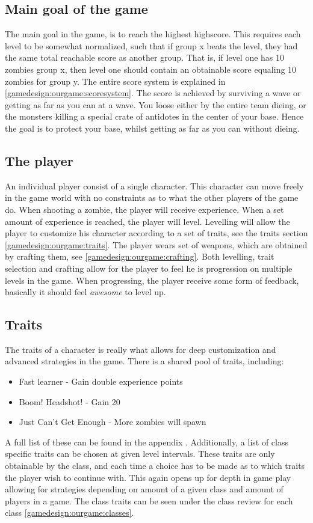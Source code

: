 \subsection*{Main goal of the game}
The main goal in the game, is to reach the highest highscore. This requires each level to be somewhat normalized, such that if group x beats the level, they had the same total reachable score as another group. That is, if level one has 10 zombies group x, then level one should contain an obtainable score equaling 10 zombies for group y. The entire score system is explained in \ref{gamedesign:ourgame:scoresystem}. The score is achieved by surviving a wave or getting as far as you can at a wave. You loose either by the entire team dieing, or the monsters killing a special crate of antidotes in the center of your base. Hence the goal is to protect your base, whilst getting as far as you can without dieing.

\subsection*{The player}
 An individual player consist of a single character. This character can move freely in the game world with no constraints as to what the other players of the game do. When shooting a zombie, the player will receive experience. When a set amount of experience is reached, the player will level. Levelling will allow the player to customize his character according to a set of traits, see the traits section \ref{gamedesign:ourgame:traits}. The player wears set of weapons, which are obtained by crafting them, see \ref{gamedesign:ourgame:crafting}. Both levelling, trait selection and crafting allow for the player to feel he is progression on multiple levels in the game. When progressing, the player receive some form of feedback, basically it should feel \emph{awesome} to level up.

\subsection*{Traits}\label{gamedesign:ourgame:traits}
The traits of a character is really what allows for deep customization and advanced strategies in the game. There is a shared pool of traits, including:
\begin{itemize}
\item Fast learner - Gain double experience points
\item Boom! Headshot!  - Gain 20%
\item Just Can’t Get Enough - More zombies will spawn
\end{itemize} 
A full list of these can be found in the appendix . Additionally, a list of class specific traits can be chosen at given level intervals. These traits are only obtainable by the class, and each time a choice has to be made as to which traits the player wish to continue with. This again opens up for depth in game play allowing for strategies depending on amount of a given class and amount of players in a game. The class traits can be seen under the class review for each class \ref{gamedesign:ourgame:classes}.

